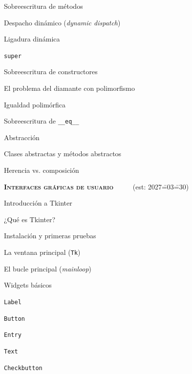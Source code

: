 \begin{longenum}
\begin{longenum}
\begin{longenum}
            \item Sobreescritura de métodos
            \begin{longenum}
                \item Despacho dinámico (\textit{dynamic dispatch})
            \end{longenum}
            \item Ligadura dinámica
            \item \texttt{super}
            \item Sobreescritura de constructores
            \item El problema del diamante con polimorfismo
            \item Igualdad polimórfica
            \item Sobreescritura de \texttt{\_\_eq\_\_}
        \end{longenum}
        \item Abstracción
        \begin{longenum}
            \item Clases abstractas y métodos abstractos
        \end{longenum}
        \item Herencia vs. composición
    \end{longenum}
    \item \textbf{\textsc{Interfaces gráficas de usuario}} \ \ \ \ \ (est: 2027\==03\==30)
    \begin{longenum}
        \item Introducción a Tkinter
        \begin{longenum}
            \item ¿Qué es Tkinter?
            \item Instalación y primeras pruebas
            \item La ventana principal (\texttt{Tk})
            \item El bucle principal (\textit{mainloop})
        \end{longenum}
        \item Widgets básicos
        \begin{longenum}
            \item \texttt{Label}
            \item \texttt{Button}
            \item \texttt{Entry}
            \item \texttt{Text}
            \item \texttt{Checkbutton}

\end{longenum}
\end{longenum}
\end{longenum}
